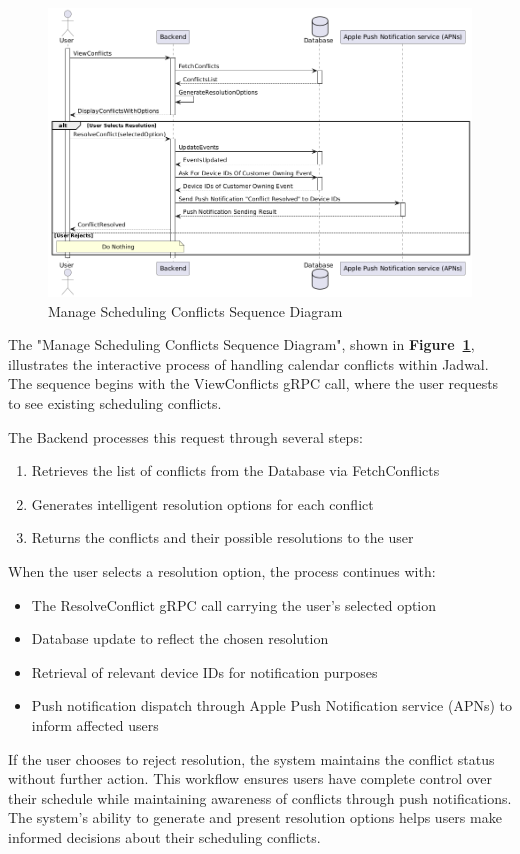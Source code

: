 \begin{figure}[!h]
  \centering
  \includegraphics[width=\textwidth]{images/docs/diagrams/sequence-diagrams/all-sequence-diagrams/Manage Scheduling Conflicts.png}
  \caption{Manage Scheduling Conflicts Sequence Diagram}
  \label{fig:seq/manage-scheduling-conflicts}
\end{figure}

The "Manage Scheduling Conflicts Sequence Diagram", shown in \textbf{Figure~\ref{fig:seq/manage-scheduling-conflicts}}, illustrates the interactive process of handling calendar conflicts within Jadwal. The sequence begins with the ViewConflicts gRPC call, where the user requests to see existing scheduling conflicts.

The Backend processes this request through several steps:
\begin{enumerate}
  \item Retrieves the list of conflicts from the Database via FetchConflicts
  \item Generates intelligent resolution options for each conflict
  \item Returns the conflicts and their possible resolutions to the user
\end{enumerate}

When the user selects a resolution option, the process continues with:
\begin{itemize}
  \item The ResolveConflict gRPC call carrying the user's selected option
  \item Database update to reflect the chosen resolution
  \item Retrieval of relevant device IDs for notification purposes
  \item Push notification dispatch through Apple Push Notification service (APNs) to inform affected users
\end{itemize}

If the user chooses to reject resolution, the system maintains the conflict status without further action. This workflow ensures users have complete control over their schedule while maintaining awareness of conflicts through push notifications. The system's ability to generate and present resolution options helps users make informed decisions about their scheduling conflicts.